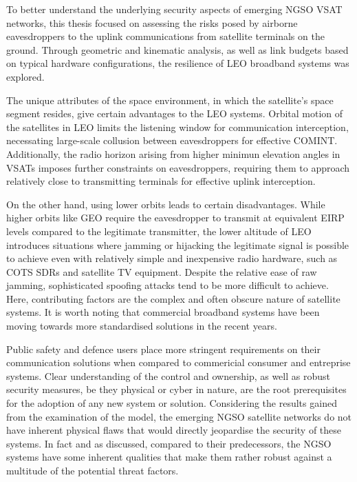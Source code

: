 \documentclass[english, 12pt, a4paper, elec, utf8, a-1b, online]{aaltothesis}
\begin{document}
To better understand the underlying security aspects of emerging NGSO VSAT networks, this thesis focused on assessing the risks posed by airborne eavesdroppers to the uplink communications from satellite terminals on the ground.
Through geometric and kinematic analysis, as well as link budgets based on typical hardware configurations, the resilience of LEO broadband systems was explored.

The unique attributes of the space environment, in which the satellite's space segment resides, give certain advantages to the LEO systems.
Orbital motion of the satellites in LEO limits the listening window for communication interception, necessating large-scale collusion between eavesdroppers for effective COMINT.
Additionally, the radio horizon  arising from higher minimun elevation angles in VSATs imposes further constraints on eavesdroppers, requiring them to approach relatively close to transmitting terminals for effective uplink interception.

On the other hand, using lower orbits leads to certain disadvantages.
While higher orbits like GEO require the eavesdropper to transmit at equivalent EIRP levels compared to the legitimate transmitter, the lower altitude of LEO introduces situations where jamming or hijacking the legitimate signal is possible to achieve even with relatively simple and inexpensive radio hardware, such as COTS SDRs and satellite TV equipment.
Despite the relative ease of raw jamming, sophisticated spoofing attacks tend to be more difficult to achieve. Here, contributing factors are the complex and often obscure nature of satellite systems.
It is worth noting that commercial broadband systems have been moving towards more standardised solutions in the recent years. 

Public safety and defence users place more stringent requirements on their communication solutions when compared to commericial consumer and entreprise systems.
Clear understanding of the control and ownership, as well as robust security measures, be they physical or cyber in nature, are the root prerequisites for the adoption of any new system or solution.
Considering the results gained from the examination of the model, the emerging NGSO satellite networks do not have inherent physical flaws that would directly jeopardise the security of these systems.
In fact and as discussed, compared to their predecessors, the NGSO systems have some inherent qualities that make them rather robust against a multitude of the potential threat factors.
\end{document}
